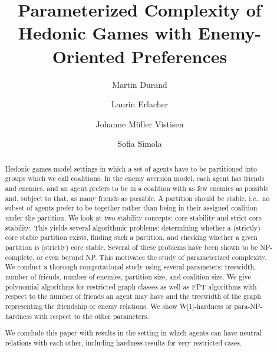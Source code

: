 \documentclass[a4paper,fleqn]{cas-sc}
\begin{document}
\title[mode=title]{Parameterized Complexity of Hedonic Games with Enemy-Oriented Preferences}



\author[l1]{Martin Durand}


\author[l1]{Laurin Erlacher}


\author[l1,l2]{ Johanne M\"uller Vistisen}

\author[l1]{Sofia Simola}




\begin{abstract}
Hedonic games model settings in which a set of agents have to be partitioned into groups which we call coalitions. In the enemy aversion model, each agent has friends and enemies, and an agent prefers to be in a coalition with as few enemies as possible and, subject to that, as many friends as possible. 
A partition should be stable, i.e., no subset of agents prefer to be together rather than being in their assigned coalition under the partition. We look at two stability concepts: core stability and strict core stability. This yields several algorithmic problems: determining whether a (strictly) core stable partition exists, finding such a partition, and checking whether a given partition is (strictly) core stable. Several of these problems have been shown to be NP-complete, or even beyond NP. 
This motivates the study of parameterized complexity. We conduct a thorough computational study using several parameters: treewidth, number of friends, number of enemies, partition size, and coalition size.
We give polynomial algorithms for restricted graph classes as well as FPT algorithms with respect to the number of friends an agent may have and the treewidth of the graph representing the friendship or enemy relations. 
We show W[1]-hardness or para-NP-hardness with respect to the other parameters.

We conclude this paper with results in the setting in which agents can have neutral relations with each other, including hardness-results for very restricted cases.
\end{abstract}
\end{document}

